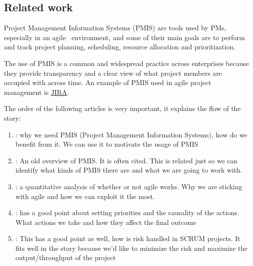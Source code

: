 \documentclass[a4paper, 12pt]{article}
\begin{document}
\subsection{Related work}


Project Management Information Systems (PMIS) are tools used by PMs, especially in an agile~\cite{alliance2001agile} environment, and some of their main goals are to perform and track project planning, scheduling, resource allocation and prioritization. 

The use of PMIS is a common and widespread practice across enterprises because they provide transparency and a clear view of what project members are occupied with across time. An example of PMIS used in agile project management is \href{https://www.atlassian.com/software/jira}{JIRA}. 

The order of the following articles is very important, it explains the flow of the story:

\begin{enumerate}
	\item \cite{CANIELS2012162}: why we need PMIS  (Project Management Information Systems), how do we benefit from it. We can use it to motivate the usage of PMIS

	\item \cite{RAYMOND2008213}: An old overview of PMIS. It is often cited. This is related just so we can identify what kinds of PMIS there are and what we are going to work with.

	\item \cite{SERRADOR20151040}: a quantitative analysis of whether or not agile works. Why we are sticking with agile and how we can exploit it the most.

	\item \cite{Toole2006APM}: has a good point about setting priorities and the causality of the actions. What actions we take and how they affect the final outcome

	\item \cite{tavares2019risk}: This has a good point as well, how is risk handled in SCRUM projects. It fits well in the story because we'd like to minimize the risk and maximize the output/throughput of the project

\end{enumerate}
\end{document}
